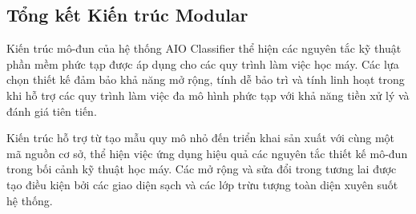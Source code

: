 \subsection{Tổng kết Kiến trúc Modular}

\noindent
Kiến trúc mô-đun của hệ thống AIO Classifier thể hiện các nguyên tắc kỹ thuật phần mềm phức tạp được áp dụng cho các quy trình làm việc học máy. Các lựa chọn thiết kế đảm bảo khả năng mở rộng, tính dễ bảo trì và tính linh hoạt trong khi hỗ trợ các quy trình làm việc đa mô hình phức tạp với khả năng tiền xử lý và đánh giá tiên tiến.

Kiến trúc hỗ trợ từ tạo mẫu quy mô nhỏ đến triển khai sản xuất với cùng một mã nguồn cơ sở, thể hiện việc ứng dụng hiệu quả các nguyên tắc thiết kế mô-đun trong bối cảnh kỹ thuật học máy. Các mở rộng và sửa đổi trong tương lai được tạo điều kiện bởi các giao diện sạch và các lớp trừu tượng toàn diện xuyên suốt hệ thống.
